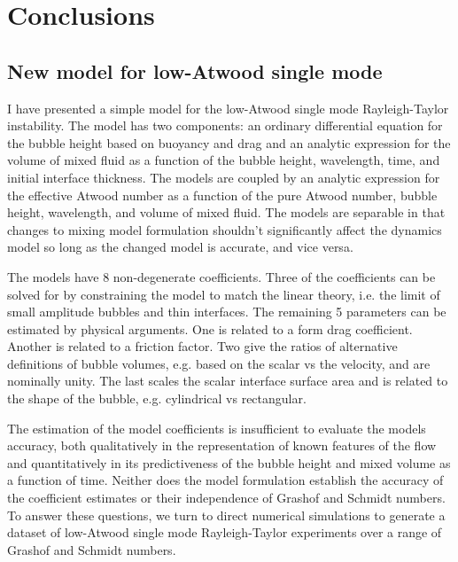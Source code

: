 \chapter{Conclusions}


\section{New model for low-Atwood single mode}
I have presented a simple model for the low-Atwood single mode Rayleigh-Taylor instability.
The model has two components: an ordinary differential equation for the bubble height based on buoyancy and drag and an analytic expression for the volume of mixed fluid as a function of the bubble height, wavelength, time, and initial interface thickness.
The models are coupled by an analytic expression for the effective Atwood number as a function of the pure Atwood number, bubble height, wavelength, and volume of mixed fluid.
The models are separable in that changes to mixing model formulation shouldn't significantly affect the dynamics model so long as the changed model is accurate, and vice versa.

The models have 8 non-degenerate coefficients.
Three of the coefficients can be solved for by constraining the model to match the linear theory, i.e. the limit of small amplitude bubbles and thin interfaces.
The remaining 5 parameters can be estimated by physical arguments.
One is related to a form drag coefficient.
Another is related to a friction factor.
Two give the ratios of alternative definitions of bubble volumes, e.g. based on the scalar vs the velocity, and are nominally unity.
The last scales the scalar interface surface area and is related to the shape of the bubble, e.g. cylindrical vs rectangular.

The estimation of the model coefficients is insufficient to evaluate the models accuracy, both qualitatively in the representation of known features of the flow and quantitatively in its predictiveness of the bubble height and mixed volume as a function of time.
Neither does the model formulation establish the accuracy of the coefficient estimates or their independence of Grashof and Schmidt numbers.
To answer these questions, we turn to direct numerical simulations to generate a dataset of low-Atwood single mode Rayleigh-Taylor experiments over a range of Grashof and Schmidt numbers.

